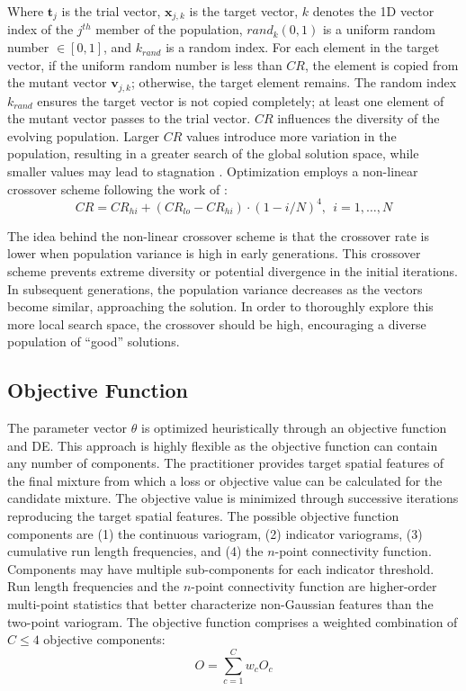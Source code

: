 Where $\mathbf{t}_{j}$ is the trial vector, $\mathbf{x}_{j, k}$ is the target vector, $k$ denotes the \gls{1D} vector index of the $j^{th}$ member of the population, $rand_{k}(0,1)$ is a uniform random number $\in [0,1]$, and $k_{rand}$ is a random index. For each element in the target vector, if the uniform random number is less than $CR$, the element is copied from the mutant vector $\mathbf{v}_{j, k}$; otherwise, the target element remains. The random index $k_{rand}$ ensures the target vector is not copied completely; at least one element of the mutant vector passes to the trial vector. $CR$ influences the diversity of the evolving population. Larger $CR$ values introduce more variation in the population, resulting in a greater search of the global solution space, while smaller values may lead to stagnation \citep{georgioudakis2020comparative}. Optimization employs a non-linear crossover scheme following the work of \cite{mohamed2014rdel}:
\begin{equation}
    CR = CR_{hi} + (CR_{lo} - CR_{hi}) \cdot (1-i/N)^{4}, \ \ i=1,\dots, N
    \label{eq:f(cross)}
\end{equation}

The idea behind the non-linear crossover scheme is that the crossover rate is lower when population variance is high in early generations. This crossover scheme prevents extreme diversity or potential divergence in the initial iterations. In subsequent generations, the population variance decreases as the vectors become similar, approaching the solution. In order to thoroughly explore this more local search space, the crossover should be high, encouraging a diverse population of ``good'' solutions.

\subsection{Objective Function}
\label{subsec:04objfunc}

The parameter vector $\theta$ is optimized heuristically through an objective function and \gls{DE}. This approach is highly flexible as the objective function can contain any number of components. The practitioner provides target spatial features of the final mixture from which a loss or objective value can be calculated for the candidate mixture. The objective value is minimized through successive iterations reproducing the target spatial features. The possible objective function components are (1) the continuous variogram, (2) indicator variograms, (3) cumulative run length frequencies, and (4) the $n$-point connectivity function. Components may have multiple sub-components for each indicator threshold. Run length frequencies and the $n$-point connectivity function are higher-order multi-point statistics that better characterize non-Gaussian features than the two-point variogram. The objective function comprises a weighted combination of $C \leq 4$ objective components:
\begin{equation}
    O = \sum_{c=1}^{C} w_{c}O_{c}
    \label{eq:fobj}
\end{equation}

